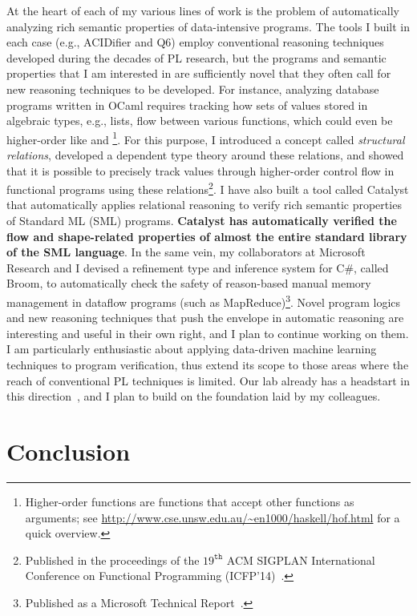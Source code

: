At the heart of each of my various lines of work is the problem of
automatically analyzing rich semantic properties of data-intensive
programs. The tools I built in each case (e.g., {\sc ACIDifier} and
{\sc Q6}) employ conventional reasoning techniques developed during
the decades of PL research, but the programs and semantic properties
that I am interested in are sufficiently novel that they often call
for new reasoning techniques to be developed. For instance, analyzing
database programs written in OCaml requires tracking how sets of
values stored in algebraic types, e.g., lists, flow between various
functions, which could even be higher-order like  and
\footnote{Higher-order functions are functions that accept
other functions as arguments; see
\url{http://www.cse.unsw.edu.au/~en1000/haskell/hof.html} for a quick
overview.}. For this purpose, I introduced a concept called
\emph{structural relations}, developed a dependent type theory around
these relations, and showed that it is possible to precisely track
values through higher-order control flow in functional programs using
these relations\footnote{Published in the proceedings of the
$19^{\texttt{th}}$ ACM SIGPLAN International Conference on Functional
Programming (ICFP'14)~\cite{icfp14}.}. I have also built a tool called
{\sc Catalyst} that automatically applies relational reasoning to
verify rich semantic properties of Standard ML (SML) programs. {\bf
{\sc Catalyst} has automatically verified the flow and shape-related
properties of almost the entire standard library of the SML language}.
In the same vein, my collaborators at Microsoft Research and I devised
a refinement type and inference system for C\#, called {\sc Broom}, to
automatically check the safety of reason-based manual memory
management in dataflow programs (such as MapReduce)\footnote{Published
as a Microsoft Technical Report~\cite{msrtr}.}.  Novel program logics
and new reasoning techniques that push the envelope in automatic
reasoning are interesting and useful in their own right, and I plan to
continue working on them. I am particularly enthusiastic about
applying data-driven machine learning techniques to program
verification, thus extend its scope to those areas where the reach of
conventional PL techniques is limited. Our lab already has a headstart
in this direction~\cite{hezhuicfp, hezhupldi}, and I plan to build on
the foundation laid by my colleagues. 

\section*{Conclusion}

